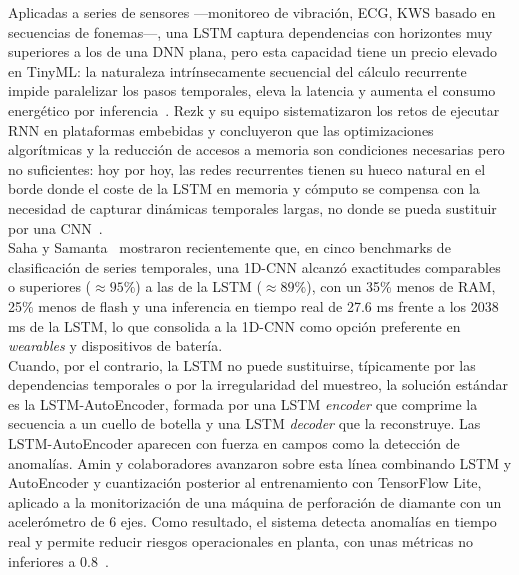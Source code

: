 \documentclass[a4paper,12pt,twoside,final]{book}
\begin{document}
Aplicadas a series de sensores ---monitoreo de vibración, ECG, KWS basado en secuencias de fonemas---, una LSTM
captura dependencias con horizontes muy superiores a los de una DNN plana, pero esta capacidad tiene un precio
elevado en TinyML: la naturaleza intrínsecamente secuencial del cálculo recurrente impide paralelizar los
pasos temporales, eleva la latencia y aumenta el consumo energético por inferencia~\cite{rezk2020ieeaccess,
rybalkin20218fpl,seo2025ieetce}. Rezk y su equipo sistematizaron los retos de ejecutar RNN en plataformas embebidas y
concluyeron que las optimizaciones algorítmicas y la reducción de accesos a memoria son condiciones necesarias pero
no suficientes: hoy por hoy, las redes recurrentes tienen su hueco natural en el borde donde el coste de la LSTM en
memoria y cómputo se compensa con la necesidad de capturar dinámicas temporales largas, no donde se pueda sustituir
por una CNN~\cite{rezk2020ieeaccess,seo2025ieetce}.\\

Saha y Samanta~\cite{saha2026lstm} mostraron recientemente que, en cinco benchmarks de clasificación de series
temporales, una 1D-CNN alcanzó exactitudes comparables o superiores ($\approx95\%$) a las de la LSTM ($\approx89\%$),
con un 35\% menos de RAM, 25\% menos de flash y una inferencia en tiempo real de 27.6 ms frente a los 2038 ms de la
LSTM, lo que consolida a la 1D-CNN como opción preferente en \textit{wearables} y dispositivos de batería.\\

Cuando, por el contrario, la LSTM no puede sustituirse, típicamente por las dependencias temporales o por la
irregularidad del muestreo, la solución estándar es la LSTM-AutoEncoder, formada por una LSTM \textit{encoder} que
comprime la secuencia a un cuello de botella y una LSTM \textit{decoder} que la reconstruye. Las LSTM-AutoEncoder
aparecen con fuerza en campos como la detección de anomalías. Amin y colaboradores avanzaron sobre esta línea
combinando LSTM y AutoEncoder y cuantización posterior al entrenamiento con TensorFlow Lite, aplicado a la
monitorización de una máquina de perforación de diamante con un acelerómetro de 6 ejes. Como resultado, el sistema
detecta anomalías en tiempo real y permite reducir riesgos operacionales en planta, con unas métricas no
inferiores a 0.8~\cite{amin2024acm}.
\end{document}
